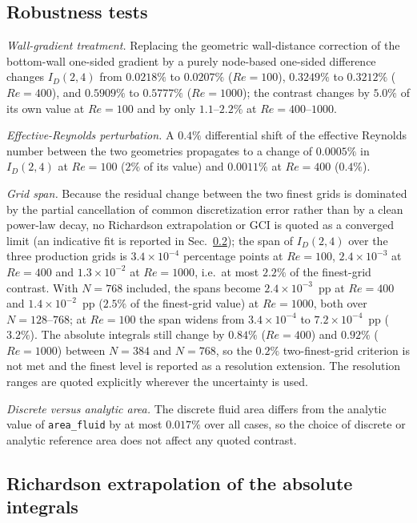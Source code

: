 \subsection{Robustness tests}

\emph{Wall-gradient treatment.} Replacing the geometric wall-distance correction of the bottom-wall one-sided gradient by a purely node-based one-sided difference changes $I_D(2,4)$ from $0.0218\%$ to $0.0207\%$ ($Re=100$), $0.3249\%$ to $0.3212\%$ ($Re=400$), and $0.5909\%$ to $0.5777\%$ ($Re=1000$); the contrast changes by $5.0\%$ of its own value at $Re=100$ and by only $1.1$--$2.2\%$ at $Re=400$--$1000$.

\emph{Effective-Reynolds perturbation.} A $0.4\%$ differential shift of the effective Reynolds number between the two geometries propagates to a change of $0.0005\%$ in $I_D(2,4)$ at $Re=100$ ($2\%$ of its value) and $0.0011\%$ at $Re=400$ ($0.4\%$).

\emph{Grid span.} Because the residual change between the two finest grids is dominated by the partial cancellation of common discretization error rather than by a clean power-law decay, no Richardson extrapolation or GCI is quoted as a converged limit (an indicative fit is reported in Sec.~\ref{suppsec:richardson}); the span of $I_D(2,4)$ over the three production grids is $3.4\times10^{-4}$ percentage points at $Re=100$, $2.4\times10^{-3}$ at $Re=400$ and $1.3\times10^{-2}$ at $Re=1000$, i.e.\ at most $2.2\%$ of the finest-grid contrast. With $N=768$ included, the spans become $2.4\times10^{-3}$~pp at $Re=400$ and $1.4\times10^{-2}$~pp ($2.5\%$ of the finest-grid value) at $Re=1000$, both over $N=128$--$768$; at $Re=100$ the span widens from $3.4\times10^{-4}$ to $7.2\times10^{-4}$~pp ($3.2\%$). The absolute integrals still change by $0.84\%$ ($Re=400$) and $0.92\%$ ($Re=1000$) between $N=384$ and $N=768$, so the $0.2\%$ two-finest-grid criterion is not met and the finest level is reported as a resolution extension. The resolution ranges are quoted explicitly wherever the uncertainty is used.

\emph{Discrete versus analytic area.} The discrete fluid area differs from the analytic value of \texttt{area\_fluid} by at most $0.017\%$ over all cases, so the choice of discrete or analytic reference area does not affect any quoted contrast.


\subsection{Richardson extrapolation of the absolute integrals}
\label{suppsec:richardson}

